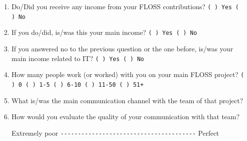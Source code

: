 \documentclass[lnbip]{svmultln}
\begin{document}
\begin{enumerate}
\item Do/Did you receive any income from your FLOSS contributions?
  \verb=( ) Yes ( ) No= \vspace{0pt}

\item If you do/did, is/was this your main income?
  \verb=( ) Yes ( ) No= \vspace{8pt}

\item If you answered no to the previous question or the one before,
  is/was your main income related to IT?  \verb=( ) Yes ( ) No=
  \vspace{8pt}

\item How many people work (or worked) with you on your main FLOSS
  project?  \verb=( ) 0 ( ) 1-5 ( ) 6-10 ( ) 11-50 ( ) 51+=
  \vspace{8pt}

\item What is/was the main communication channel with the team of that
  project?
  \vspace{8pt}

\item How would you evaluate the quality of your communication with
  that team?

  Extremely poor \verb=---------------------------------------=
  Perfect \vspace{8pt}


\end{enumerate}
\end{document}
